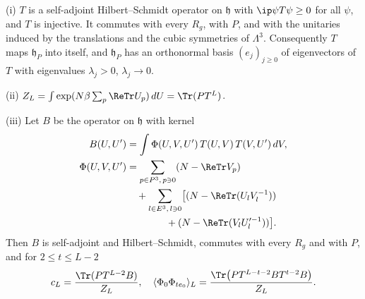 \begin{lemma}\label{rEtwo:transfer}
\textup{(i)} $T$ is a self-adjoint Hilbert--Schmidt operator on
$\mathfrak h$ with $\ip\psi{T\psi}\ge0$ for all $\psi$, and $T$ is
injective. It commutes with every $R_g$, with $P$, and with the unitaries
induced by the translations and the cubic symmetries of $\Lambda^3$.
Consequently $T$ maps $\mathfrak h_P$ into itself, and $\mathfrak h_P$ has
an orthonormal basis $(e_j)_{j\ge0}$ of eigenvectors of $T$ with
eigenvalues $\lambda_j>0$, $\lambda_j\to0$.

\textup{(ii)} $Z_L=\int\exp(N\beta\sum_p\ReTr U_p)\,dU=\Tr(PT^L)$.

\textup{(iii)} Let $B$ be the operator on $\mathfrak h$ with kernel
\begin{align*}
B(U,U')&=\int\Phi(U,V,U')\,T(U,V)\,T(V,U')\,dV,\\
\Phi(U,V,U')&=\sum_{p\in P^3,\,p\ni0}(N-\ReTr V_p)\\
&\quad+\sum_{l\in E^3,\,l\ni0}\bigl[(N-\ReTr(U_lV_l^{-1}))\\
&\qquad\qquad+(N-\ReTr(V_lU_l'^{-1}))\bigr].
\end{align*}
Then $B$ is self-adjoint and Hilbert--Schmidt, commutes with every
$R_g$ and with $P$, and for $2\le t\le L-2$
\[
c_L=\frac{\Tr(PT^{L-2}B)}{Z_L},\quad\langle\Phi_0\Phi_{te_0}\rangle_L=
\frac{\Tr\bigl(PT^{L-t-2}BT^{t-2}B\bigr)}{Z_L}.
\]
\end{lemma}

